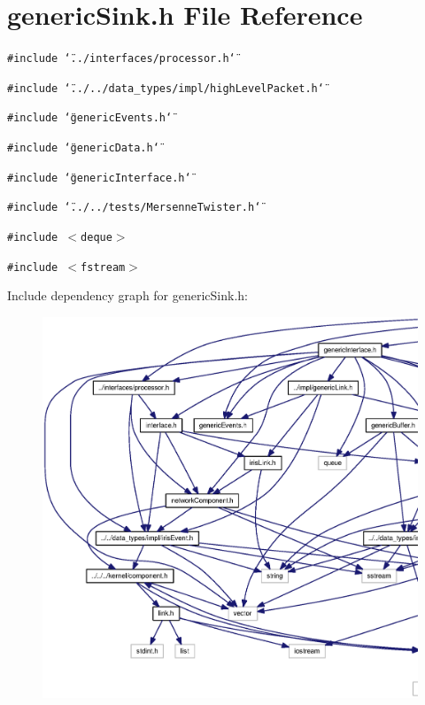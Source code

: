 \section{genericSink.h File Reference}
\label{genericSink_8h}
{\tt \#include \char`\"{}../interfaces/processor.h\char`\"{}}\par
{\tt \#include \char`\"{}../../data\_\-types/impl/highLevelPacket.h\char`\"{}}\par
{\tt \#include \char`\"{}genericEvents.h\char`\"{}}\par
{\tt \#include \char`\"{}genericData.h\char`\"{}}\par
{\tt \#include \char`\"{}genericInterface.h\char`\"{}}\par
{\tt \#include \char`\"{}../../tests/MersenneTwister.h\char`\"{}}\par
{\tt \#include $<$deque$>$}\par
{\tt \#include $<$fstream$>$}\par


Include dependency graph for genericSink.h:\nopagebreak
\begin{figure}[H]
\begin{center}
\leavevmode
\includegraphics[width=420pt]{genericSink_8h__incl}
\end{center}
\end{figure}


